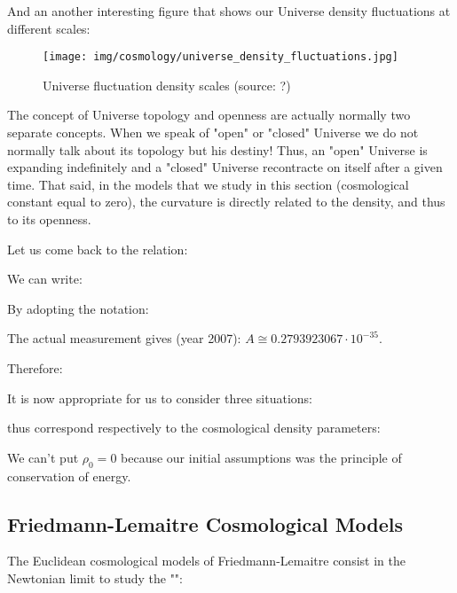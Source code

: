 	And an another interesting figure that shows our Universe density fluctuations at different scales:
	\begin{figure}[H]
		\begin{center}
		\texttt{[image: img/cosmology/universe\_density\_fluctuations.jpg]}
		\end{center}	
		\caption[Universe fluctuation density scales]{Universe fluctuation density scales (source: ?)}
	\end{figure}
	\begin{tcolorbox}[title=Remark,colframe=black,arc=10pt]
	The concept of Universe topology and openness are actually normally two separate concepts. When we speak of "open" or "closed" Universe we do not normally talk about its topology but his destiny! Thus, an "open" Universe is expanding indefinitely and a "closed" Universe recontracte on itself after a given time. That said, in the models that we study in this section (cosmological constant equal to zero), the curvature is directly related to the density, and thus to its openness.
	\end{tcolorbox}
	Let us come back to the relation:
	
	We can write:
	
	By adopting the notation:
	
	\begin{tcolorbox}[title=Remark,colframe=black,arc=10pt]
	The actual measurement gives (year 2007): $A\cong 0.2793923067\cdot 10^{-35}$.
	\end{tcolorbox}
	Therefore:
	
	It is now appropriate for us to consider three situations:
	
	thus correspond respectively to the cosmological density parameters:
	
	\begin{tcolorbox}[title=Remark,colframe=black,arc=10pt]
	We can't put $\rho_0=0$ because our initial assumptions was the principle of conservation of energy.
	\end{tcolorbox}
	
	\pagebreak	
	\subsection{Friedmann-Lemaitre Cosmological Models}
	The Euclidean cosmological models of Friedmann-Lemaitre consist in the Newtonian  limit to study the  "":
	

